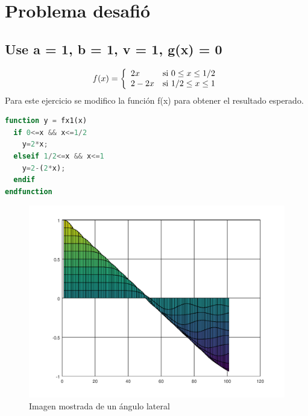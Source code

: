 \documentclass{article}
\begin{document}
\section{Problema desafió}
\subsection{Use a = 1, b = 1, v = 1, g(x) = 0}
\begin{equation}
    f(x)=  \left\lbrace
    \begin{array}{ll}
2x & \textup{si } 0\leq x\leq 1/2 \\
2-2x & \textup{si } 1/2 \leq x \leq 1
\end{array}
\right.
\end{equation}
Para este ejercicio se modifico la función f(x) para obtener el resultado esperado.
\begin{lstlisting}[language=Octave, caption=Funcion f(x) modificada para cumplir las condiciones que se pide,label=lst:fxMod]
function y = fx1(x)
  if 0<=x && x<=1/2
    y=2*x;
  elseif 1/2<=x && x<=1
    y=2-(2*x);
  endif
endfunction
\end{lstlisting}
\begin{figure}[H]
    \centering
    \includegraphics[scale=0.8]{3.1.png}
    \caption{Imagen mostrada de un ángulo lateral}
\end{figure}
\end{document}
